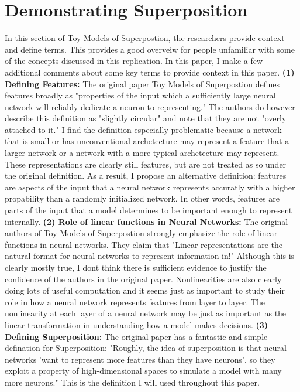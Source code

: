 \documentclass{article} %
\begin{document}
\section{Demonstrating Superposition}

In this section of Toy Models of Superpostion\cite{elhage2022toy}, the researchers
provide context and define terms. This provides a good overveiw for people
unfamiliar with some of the concepts discussed in this replication.\newline\newline
In this paper, I make a few additional comments about some key terms to provide
context in this paper. \newline \newline
\textbf{(1) Defining Features: }The original paper Toy Models of Superpostion
defines features broadly as "properties of the input which a sufficiently large 
neural network will reliably dedicate a neuron to representing." The authors do
however describe this definition as "slightly circular" and note that they are
not "overly attached to it." I find the definition especially problematic because a network that is small or
has unconventional archetecture may represent a feature that a larger network
or a network with a more typical archetecture may represent. These 
representations are clearly still features, but are not treated as so under the
original definition.\newline\newline
As a result, I propose an alternative definition: features are aspects of the
input that a neural network represents accuratly with a higher propability than 
a randomly initialized network. In other words, features are parts of the input 
that a model determines to be important enough to represent internally.\newline\newline
\textbf{(2) Role of linear functions in Neural Networks: }The original authors of
Toy Models of Superpostion strongly emphasize the role of linear functions in
neural networks. They claim that "Linear representations are the natural format 
for neural networks to represent information in!" Although this is clearly 
mostly true, I dont think there is sufficient evidence to justify the confidence 
of the authors in the original paper. Nonlinearities are also clearly doing lots 
of useful computation and it seems just as important to study their role in how 
a neural network represents features from layer to layer. The nonlinearity at 
each layer of a neural network may be just as important as the linear 
transformation in understanding how a model makes decisions.\newline\newline
\textbf{(3) Defining Superposition: } The original paper has a fantastic and
simple defination for Superposition: "Roughly, the idea of 
superposition is that neural networks 'want to represent more features than they 
have neurons', so they exploit a property of high-dimensional spaces to 
simulate a model with many more neurons." This is the definition I will used
throughout this paper.



\end{document}
